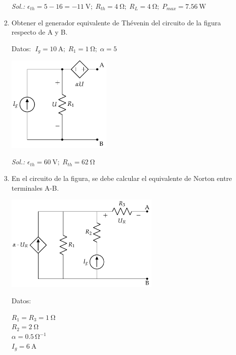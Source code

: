 \begin{enumerate}
    \emph{Sol.:\;
      $\epsilon_{th}=5-16=\qty{-11}{\volt};\; R_{th}=\qty{4}{\ohm};\;
      R_L=\qty{4}{\ohm};\;P_{max}=\qty{7.56}{\watt}$}


  \item Obtener el generador equivalente de Thévenin del circuito de la figura respecto de A y B.
  
    Datos: $\; I_g=\qty{10}{\ampere};\; R_1=\qty{1}{\ohm};\; \alpha=5$
    \begin{center}
      \includegraphics[height=4.75cm]{../figs/Thevenin1.pdf}
    \end{center}

    \emph{Sol.:\; $\epsilon_{th}=\qty{60}{\volt};\; R_{th}=\qty{62}{\ohm}$}


    \item En el circuito de la figura, se debe calcular el equivalente de Norton entre terminales A-B.

    \begin{minipage}{0.6\linewidth}
      \includegraphics[height=4.75cm]{../figs/BT1_ej19_enunciado.pdf}
    \end{minipage}
    \begin{minipage}{0.4\linewidth}
      Datos:
      \vspace{2mm}
      
      $R_1 = R_3 = \qty{1}{\ohm}$\\[1mm]
      $R_2 = \qty{2}{\ohm}$\\[1mm]
      $\alpha = 0.5\,\si{\ohm}^{-1}$\\[1mm]
      $I_g = \qty{6}{\ampere}$
    \end{minipage}


\end{enumerate}
